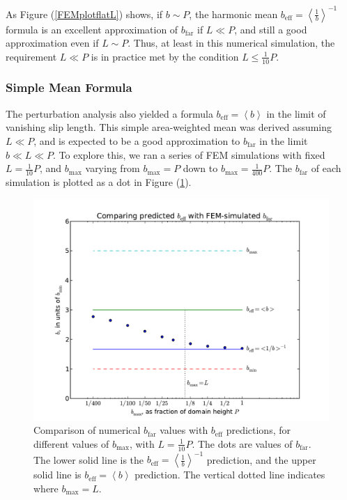 \documentclass[12pt, a4paper, twoside, openright]{book}
\newcommand{\beff}{\ensuremath{b_{\mathrm{eff}}}}
\newcommand{\bmax}{\ensuremath{b_{\mathrm{max}}}}
\newcommand{\bfar}{\ensuremath{b_{\mathrm{far}}}}
\newcommand{\beffh}{\ensuremath{b_{\mathrm{eff}}} = \left< \frac{1}{b} \right>^{-1} }
\newcommand{\beffm}{\ensuremath{b_{\mathrm{eff}}} = \left< b \right> }
\begin{document}
As Figure (\ref{FEMplotflatL}) shows, if $b \sim P$, the harmonic mean $\beffh$ formula is an excellent approximation of $\bfar$ if $L \ll P$, and still a good approximation even if $L \sim P$.  Thus, at least in this numerical simulation, the requirement $L \ll P$ is in practice met by the condition $L \leq \frac{1}{10}P$.

\clearpage
\subsubsection{Simple Mean Formula}

The perturbation analysis also yielded a formula $\beffm$ in the limit of vanishing slip length.  This simple area-weighted mean was derived assuming $L \ll P$, and is expected to be a good approximation to $\bfar$ in the limit $b \ll L \ll P$.  To explore this, we ran a series of FEM simulations with fixed $L = \frac{1}{10}P$, and $\bmax$ varying from $\bmax = P$ down to $\bmax = \frac{1}{400}P$.  The $\bfar$ of each simulation is plotted as a dot in Figure (\ref{FEMplotflatb}).

\begin{figure}[ht]
\includegraphics[scale=0.595]{Lund_Thesis_FEM_plot_flat_b}
\caption{Comparison of numerical $\bfar$ values with $\beff$ predictions, for different values of $\bmax$, with $L = \frac{1}{10}P$. The dots are values of $\bfar$. The lower solid line is the $\beffh$ prediction, and the upper solid line is $\beffm$ prediction.  The vertical dotted line indicates where $\bmax = L$.}\label{FEMplotflatb}
\end{figure}
\end{document}
